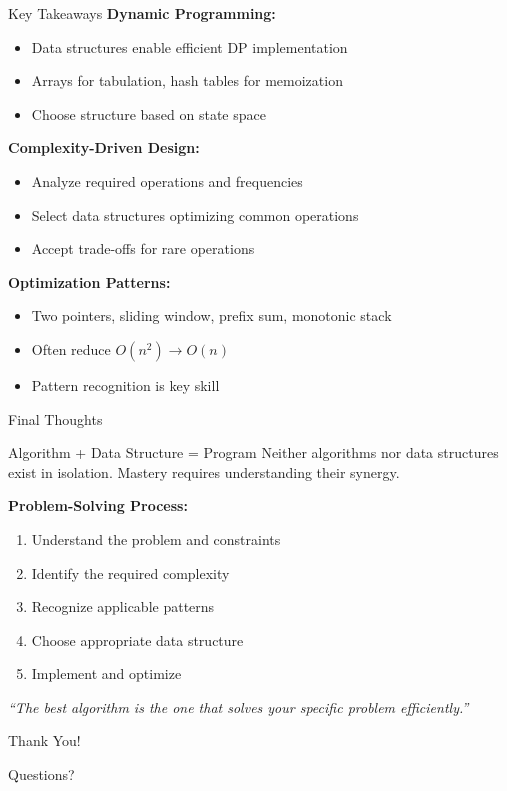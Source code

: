 \documentclass[aspectratio=169,xcolor=dvipsnames]{beamer}
\begin{document}
\begin{frame}{Key Takeaways}
  \textbf{Dynamic Programming:}
  \begin{itemize}
    \item Data structures enable efficient DP implementation
    \item Arrays for tabulation, hash tables for memoization
    \item Choose structure based on state space
  \end{itemize}

  \vspace{0.2cm}
  \textbf{Complexity-Driven Design:}
  \begin{itemize}
    \item Analyze required operations and frequencies
    \item Select data structures optimizing common operations
    \item Accept trade-offs for rare operations
  \end{itemize}

  \vspace{0.2cm}
  \textbf{Optimization Patterns:}
  \begin{itemize}
    \item Two pointers, sliding window, prefix sum, monotonic stack
    \item Often reduce $O(n^2) \to O(n)$
    \item Pattern recognition is key skill
  \end{itemize}
\end{frame}

\begin{frame}{Final Thoughts}
  \begin{block}{Algorithm + Data Structure = Program}
    Neither algorithms nor data structures exist in isolation. Mastery requires understanding their synergy.
  \end{block}

  \vspace{0.3cm}
  \textbf{Problem-Solving Process:}
  \begin{enumerate}
    \item Understand the problem and constraints
    \item Identify the required complexity
    \item Recognize applicable patterns
    \item Choose appropriate data structure
    \item Implement and optimize
  \end{enumerate}

  \vspace{0.3cm}
  \begin{center}
    \textit{``The best algorithm is the one that solves your specific problem efficiently.''}
  \end{center}
\end{frame}

\begin{frame}
  \begin{center}
    {\Huge Thank You!}

    \vspace{1cm}
    {\Large Questions?}
  \end{center}
\end{frame}
\end{document}
